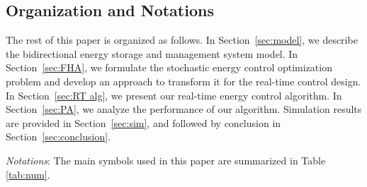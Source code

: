 \documentclass[journal]{IEEEtran}
\begin{document}
\subsection{Organization and Notations} The rest of this paper is organized as follows. In Section~\ref{sec:model}, we describe the bidirectional energy storage and management system model. In Section~\ref{sec:FHA}, we formulate the  stochastic energy control optimization problem  and develop an approach to transform it  for the real-time control design. In Section~\ref{sec:RT alg}, we present our real-time energy control algorithm. In Section~\ref{sec:PA}, we analyze the performance of our algorithm. Simulation results are provided in Section~\ref{sec:sim}, and followed by conclusion in Section~\ref{sec:conclusion}.

\emph{Notations}:
The main symbols used in this paper are summarized in Table \ref{tab:num}.
\end{document}
